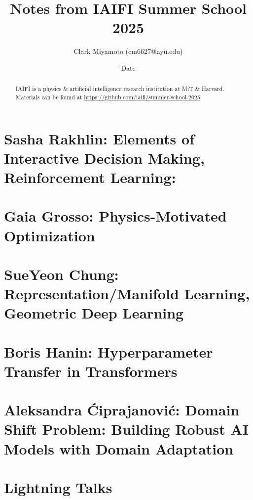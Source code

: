 \documentclass[12pt,fleqn]{article}
\title{Notes from IAIFI Summer School 2025}
\author{Clark Miyamoto (cm6627@nyu.edu)}
\date{Date}
\numberwithin{equation}{section} %
\begin{document}
\maketitle
\begin{abstract}
	IAIFI is a physics \& artificial intelligence research institution at MiT \& Harvard. Materials can be found at \url{https://github.com/iaifi/summer-school-2025}.
\end{abstract}
\tableofcontents



\newpage
\part{Sasha Rakhlin: Elements of Interactive Decision Making, Reinforcement Learning:}


\newpage
\part{Gaia Grosso: Physics-Motivated Optimization}


\newpage
\part{SueYeon Chung: Representation/Manifold Learning, Geometric Deep Learning}


\newpage
\part{Boris Hanin: Hyperparameter Transfer in Transformers}


\newpage
\part{Aleksandra \'Ciprajanovi\'c: Domain Shift Problem: Building Robust AI Models with Domain Adaptation}


\newpage
\part{Lightning Talks}

\end{document}

